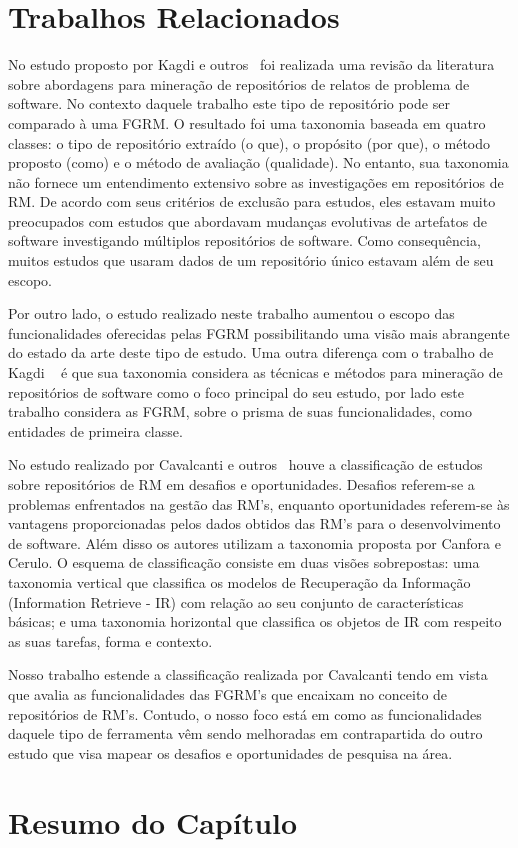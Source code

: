 \section{Trabalhos Relacionados}
\label{sec:map_trabalhos_relacionados}

No estudo proposto por Kagdi e outros~\cite{kagdi2012assigning} foi realizada
uma revisão da literatura sobre abordagens para mineração de repositórios de
relatos de problema de software. No contexto daquele trabalho este tipo de
repositório pode ser comparado à uma FGRM\@. O resultado foi uma taxonomia
baseada em quatro classes: o tipo de repositório extraído (o que), o propósito
(por que), o método proposto (como) e o método de avaliação (qualidade). No
entanto, sua taxonomia não fornece um entendimento extensivo sobre as
investigações em repositórios de RM. De acordo com seus critérios de exclusão
para estudos, eles estavam muito preocupados com estudos que abordavam mudanças
evolutivas de artefatos de software investigando múltiplos repositórios de
software. Como consequência, muitos estudos que usaram dados de um repositório
único estavam além de seu escopo.

Por outro lado, o estudo realizado neste trabalho aumentou o escopo das
funcionalidades oferecidas pelas FGRM possibilitando uma visão mais abrangente
do estado da arte deste tipo de estudo. Uma outra diferença com o trabalho de
Kagdi ~\cite{kagdi2012assigning} é que sua taxonomia considera as técnicas e
métodos para mineração de repositórios de software como o foco principal do seu
estudo, por lado este trabalho considera as FGRM, sobre o prisma de suas
funcionalidades, como entidades de primeira classe.

No estudo realizado por Cavalcanti e outros~\cite{cavalcanti2014challenges}
houve a classificação de estudos sobre repositórios de RM em desafios e
oportunidades.  Desafios referem-se a problemas enfrentados na gestão das RM's,
enquanto oportunidades referem-se às vantagens proporcionadas pelos dados
obtidos das  RM's para o desenvolvimento de software. Além disso os autores
utilizam a taxonomia proposta por Canfora e Cerulo\cite{cerulo2004taxonomy}. O
esquema de classificação consiste em duas visões sobrepostas: uma taxonomia
vertical que classifica os modelos de Recuperação da Informação (Information
Retrieve - IR) com relação ao seu conjunto de características básicas; e uma
taxonomia horizontal que classifica os objetos de IR com respeito as suas
tarefas, forma e contexto.

Nosso trabalho estende a classificação realizada por Cavalcanti tendo em vista
que avalia as funcionalidades das FGRM's  que encaixam no conceito de
repositórios de RM's. Contudo, o nosso foco está em como as funcionalidades
daquele tipo de ferramenta vêm sendo melhoradas em contrapartida do outro estudo
que visa mapear os desafios e oportunidades de pesquisa na área.

\section{Resumo do Capítulo}
\label{sec:resumo_capitulo}